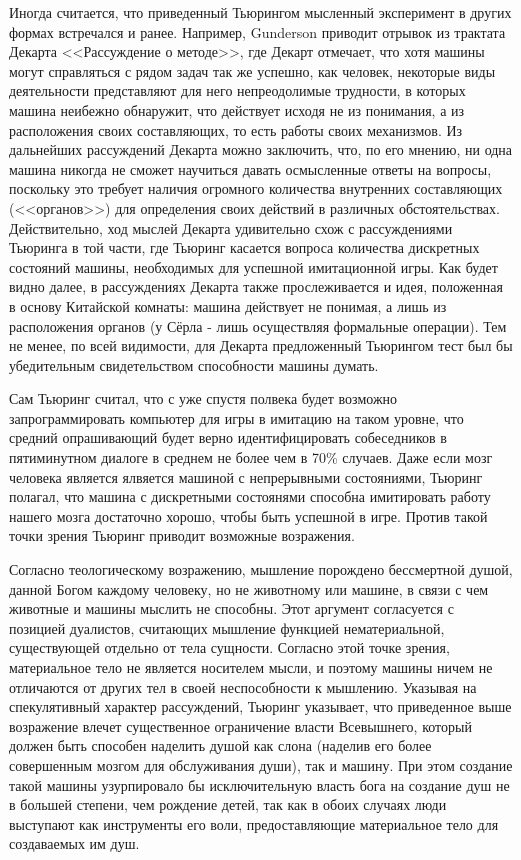 \documentclass[12pt, specialist, subf, substylefile = spbu.rtx]{disser}
\begin{document}
Иногда считается, что приведенный Тьюрингом мысленный эксперимент в других формах встречался и ранее. Например, Gunderson \cite{Gunderson1964-KEIDLM} приводит отрывок из трактата Декарта <<Рассуждение о методе>>, где Декарт отмечает, что хотя машины могут справляться с рядом задач так же успешно, как человек, некоторые виды деятельности представляют для него непреодолимые трудности, в которых машина неибежно обнаружит, что действует исходя не из понимания, а из расположения своих составляющих, то есть работы своих механизмов. Из дальнейших рассуждений Декарта можно заключить, что, по его мнению, ни одна машина никогда не сможет научиться давать осмысленные ответы на вопросы, поскольку это требует наличия огромного количества внутренних составляющих (<<органов>>) для определения своих действий в различных обстоятельствах. Действительно, ход мыслей Декарта удивительно схож с рассуждениями Тьюринга в той части, где Тьюринг касается вопроса количества дискретных состояний машины, необходимых для успешной имитационной игры. Как будет видно далее, в рассуждениях Декарта также прослеживается и идея, положенная в основу Китайской комнаты: машина действует не понимая, а лишь из расположения органов (у Сёрла - лишь осуществляя формальные операции). Тем не менее, по всей видимости, для Декарта предложенный Тьюрингом тест был бы убедительным свидетельством способности машины думать.

Сам Тьюринг считал, что с уже спустя полвека будет возможно запрограммировать компьютер для игры в имитацию на таком уровне, что средний опрашивающий будет верно идентифицировать собеседников в пятиминутном диалоге в среднем не более чем в 70\% случаев. Даже если мозг человека является ялвяется машиной с непрерывными состояниями, Тьюринг полагал, что машина с дискретными состоянями способна имитировать работу нашего мозга достаточно хорошо, чтобы быть успешной в игре. Против такой точки зрения Тьюринг приводит возможные возражения.

Согласно теологическому возражению, мышление порождено бессмертной душой, данной Богом каждому человеку, но не животному или машине, в связи с чем животные и машины мыслить не способны. Этот аргумент согласуется с позицией дуалистов, считающих мышление функцией нематериальной, существующей отдельно от тела сущности. Согласно этой точке зрения, материальное тело не является носителем мысли, и поэтому машины ничем не отличаются от других тел в своей неспособности к мышлению. Указывая на спекулятивный характер рассуждений, Тьюринг указывает, что приведенное выше возражение влечет существенное ограничение власти Всевышнего, который должен быть способен наделить душой как слона (наделив его более совершенным мозгом для обслуживания души), так и машину. При этом создание такой машины узурпировало бы исключительную власть бога на создание душ не в большей степени, чем рождение детей, так как в обоих случаях люди выступают как инструменты его воли, предоставляющие материальное тело для создаваемых им душ.
\end{document}
